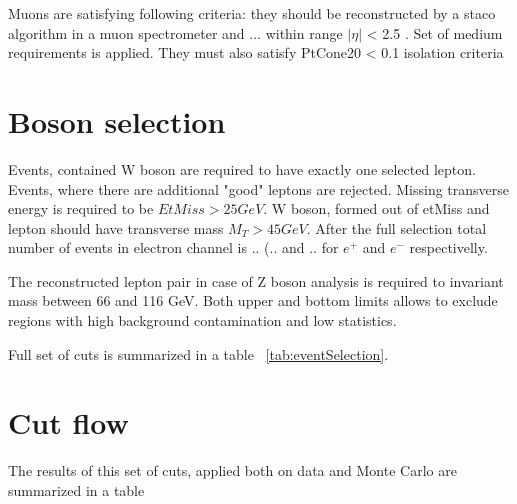 Muons are satisfying following criteria: they should be reconstructed by a staco algorithm in a muon spectrometer and ... within range $|\eta|$ < 2.5 . Set of medium requirements is applied. They must also satisfy PtCone20 < 0.1 isolation criteria

\section{Boson selection}
Events, contained W boson are required to have exactly one selected lepton. Events, where there are additional "good" leptons are rejected. Missing transverse energy is required to be $EtMiss>25 GeV$.  W boson, formed out of etMiss and lepton should have transverse mass $M_T > 45 GeV$. After the full selection total number of events in electron channel is .. (.. and .. for $e^+$ and $e^-$ respectivelly. 

The reconstructed lepton pair in case of Z boson analysis is required to invariant mass between 66 and 116 GeV. Both upper and bottom limits allows to exclude regions with high background contamination and low statistics. 

Full set of cuts is summarized in a table ~\ref{tab:eventSelection}.
\section{Cut flow}
The results of this set of cuts, applied both on data and Monte Carlo are summarized in a table 



